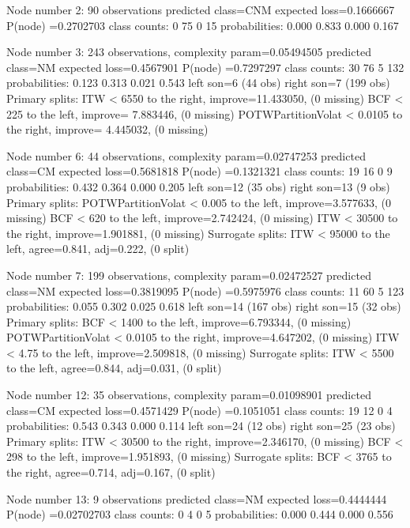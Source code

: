 \documentclass{article}
\begin{document}
\begin{Schunk}
\begin{Soutput}
Node number 2: 90 observations
  predicted class=CNM  expected loss=0.1666667  P(node) =0.2702703
    class counts:     0    75     0    15
   probabilities: 0.000 0.833 0.000 0.167 

Node number 3: 243 observations,    complexity param=0.05494505
  predicted class=NM   expected loss=0.4567901  P(node) =0.7297297
    class counts:    30    76     5   132
   probabilities: 0.123 0.313 0.021 0.543 
  left son=6 (44 obs) right son=7 (199 obs)
  Primary splits:
      ITW                < 6550   to the right, improve=11.433050, (0 missing)
      BCF                < 225    to the left,  improve= 7.883446, (0 missing)
      POTWPartitionVolat < 0.0105 to the right, improve= 4.445032, (0 missing)

Node number 6: 44 observations,    complexity param=0.02747253
  predicted class=CM   expected loss=0.5681818  P(node) =0.1321321
    class counts:    19    16     0     9
   probabilities: 0.432 0.364 0.000 0.205 
  left son=12 (35 obs) right son=13 (9 obs)
  Primary splits:
      POTWPartitionVolat < 0.005  to the left,  improve=3.577633, (0 missing)
      BCF                < 620    to the left,  improve=2.742424, (0 missing)
      ITW                < 30500  to the right, improve=1.901881, (0 missing)
  Surrogate splits:
      ITW < 95000  to the left,  agree=0.841, adj=0.222, (0 split)

Node number 7: 199 observations,    complexity param=0.02472527
  predicted class=NM   expected loss=0.3819095  P(node) =0.5975976
    class counts:    11    60     5   123
   probabilities: 0.055 0.302 0.025 0.618 
  left son=14 (167 obs) right son=15 (32 obs)
  Primary splits:
      BCF                < 1400   to the left,  improve=6.793344, (0 missing)
      POTWPartitionVolat < 0.0105 to the right, improve=4.647202, (0 missing)
      ITW                < 4.75   to the left,  improve=2.509818, (0 missing)
  Surrogate splits:
      ITW < 5500   to the left,  agree=0.844, adj=0.031, (0 split)

Node number 12: 35 observations,    complexity param=0.01098901
  predicted class=CM   expected loss=0.4571429  P(node) =0.1051051
    class counts:    19    12     0     4
   probabilities: 0.543 0.343 0.000 0.114 
  left son=24 (12 obs) right son=25 (23 obs)
  Primary splits:
      ITW < 30500  to the right, improve=2.346170, (0 missing)
      BCF < 298    to the left,  improve=1.951893, (0 missing)
  Surrogate splits:
      BCF < 3765   to the right, agree=0.714, adj=0.167, (0 split)

Node number 13: 9 observations
  predicted class=NM   expected loss=0.4444444  P(node) =0.02702703
    class counts:     0     4     0     5
   probabilities: 0.000 0.444 0.000 0.556 


\end{Soutput}
\end{Schunk}
\end{document}
